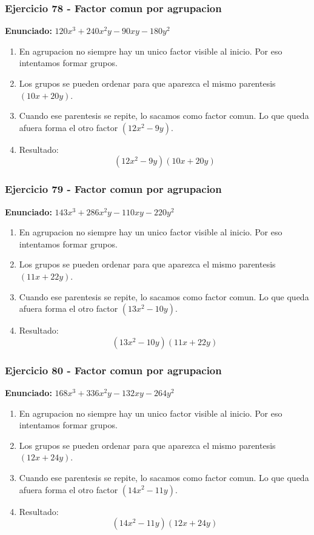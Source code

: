 \documentclass[11pt,a4paper]{article}
\begin{document}
\vspace{0.2cm}
\subsubsection*{Ejercicio 78 - Factor comun por agrupacion}
\textbf{Enunciado:} $ 120 x^{3} + 240 x^{2} y - 90 x y - 180 y^{2} $\par
\begin{enumerate}[leftmargin=2em]
\item En agrupacion no siempre hay un unico factor visible al inicio. Por eso intentamos formar grupos.
\item Los grupos se pueden ordenar para que aparezca el mismo parentesis \((10 x + 20 y)\).
\item Cuando ese parentesis se repite, lo sacamos como factor comun. Lo que queda afuera forma el otro factor \((12 x^{2} - 9 y)\).
\item Resultado: \[\boxed{\left(12 x^{2} - 9 y\right)\left(10 x + 20 y\right)}\]
\end{enumerate}

\vspace{0.2cm}
\subsubsection*{Ejercicio 79 - Factor comun por agrupacion}
\textbf{Enunciado:} $ 143 x^{3} + 286 x^{2} y - 110 x y - 220 y^{2} $\par
\begin{enumerate}[leftmargin=2em]
\item En agrupacion no siempre hay un unico factor visible al inicio. Por eso intentamos formar grupos.
\item Los grupos se pueden ordenar para que aparezca el mismo parentesis \((11 x + 22 y)\).
\item Cuando ese parentesis se repite, lo sacamos como factor comun. Lo que queda afuera forma el otro factor \((13 x^{2} - 10 y)\).
\item Resultado: \[\boxed{\left(13 x^{2} - 10 y\right)\left(11 x + 22 y\right)}\]
\end{enumerate}

\vspace{0.2cm}
\subsubsection*{Ejercicio 80 - Factor comun por agrupacion}
\textbf{Enunciado:} $ 168 x^{3} + 336 x^{2} y - 132 x y - 264 y^{2} $\par
\begin{enumerate}[leftmargin=2em]
\item En agrupacion no siempre hay un unico factor visible al inicio. Por eso intentamos formar grupos.
\item Los grupos se pueden ordenar para que aparezca el mismo parentesis \((12 x + 24 y)\).
\item Cuando ese parentesis se repite, lo sacamos como factor comun. Lo que queda afuera forma el otro factor \((14 x^{2} - 11 y)\).
\item Resultado: \[\boxed{\left(14 x^{2} - 11 y\right)\left(12 x + 24 y\right)}\]
\end{enumerate}
\end{document}
